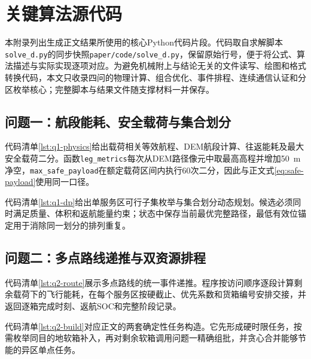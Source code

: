 \section{关键算法源代码}\label{app:key-code}

本附录列出生成正文结果所使用的核心Python代码片段。代码取自求解脚本\texttt{solve\_d.py}的同步快照\texttt{paper/code/solve\_d.py}，保留原始行号，便于将公式、算法描述与实际实现逐项对应。为避免机械附上与结论无关的文件读写、绘图和格式转换代码，本文只收录四问的物理计算、组合优化、事件排程、连续通信认证和分区枚举核心；完整脚本与结果文件随支撑材料一并保存。

\subsection{问题一：航段能耗、安全载荷与集合划分}

代码清单\ref{lst:q1-physics}给出载荷相关等效航程、DEM航段计算、往返能耗及最大安全载荷二分。函数\texttt{leg\_metrics}每次从DEM路径像元中取最高高程并增加50~m净空，\texttt{max\_safe\_payload}在额定载荷区间内执行60次二分，因此与正文式\eqref{eq:safe-payload}使用同一口径。



代码清单\ref{lst:q1-dp}给出单服务区可行子集枚举与集合划分动态规划。候选必须同时满足质量、体积和返航能量约束；状态中保存当前最优完整路径，最低有效位锚定用于消除同一划分的排列重复。



\subsection{问题二：多点路线递推与双资源排程}

代码清单\ref{lst:q2-route}展示多点路线的统一事件递推。程序按访问顺序逐段计算剩余载荷下的飞行能耗，在每个服务区按硬截止、优先系数和货箱编号安排交接，并返回逐箱完成时刻、返航SOC和完整阶段记录。



代码清单\ref{lst:q2-build}对应正文的两套确定性任务构造。它先形成硬时限任务，按需枚举同目的地软箱补入，再对剩余软箱调用问题一精确组批，并贪心合并能够节能的异区单点任务。

